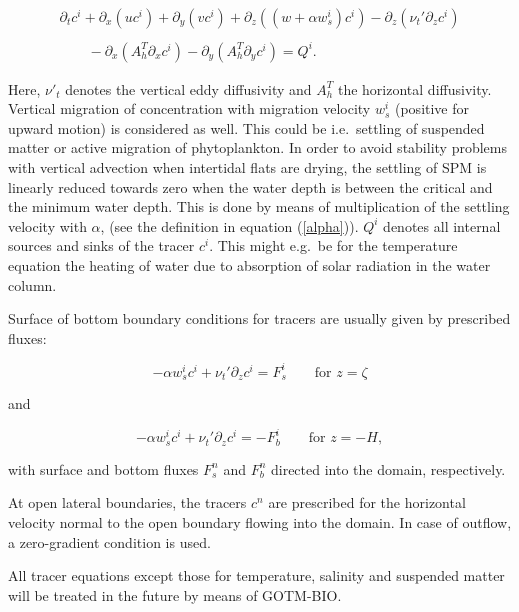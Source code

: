 \begin{equation}\label{densz}
\begin{array}{l}
\partial_t c^i +\partial_x (uc^i) +\partial_y(vc^i) 
+\partial_z ((w+\alpha w_s^i)c^i)
-\partial_z(\nu_t' \partial_z c^i)
\\ \\ \displaystyle \qquad
-\partial_x(A_h^T \partial_x c^i)
-\partial_y(A_h^T \partial_y c^i)
=Q^i.
\end{array} 
\end{equation}

Here, $\nu'_t$ denotes the vertical eddy diffusivity and
$A_h^T$ the horizontal diffusivity.
Vertical migration of concentration with migration velocity
$w_s^i$ (positive for upward motion) is considered as well. This could be 
i.e.\ settling of suspended matter or active migration of
phytoplankton.  
In order to avoid stability problems with vertical advection when 
intertidal flats are drying, the settling of SPM is linearly 
reduced towards zero when the water
depth is between the critical and the minimum water depth. 
This is
done by means of multiplication of the settling velocity with $\alpha$,
(see the definition in equation (\ref{alpha})).
$Q^i$ denotes all internal sources and sinks of the tracer $c^i$.
This might e.g.\ be for the temperature equation the heating of water
due to absorption of solar radiation in the water column.

Surface of bottom boundary conditions for tracers are usually given
by prescribed fluxes:

\begin{equation}\label{SurfFlux}
-\alpha w_s^i c^i+\nu_t' \partial_z c^i = F^i_s  \qquad \mbox{for } z=\zeta
\end{equation}

and 

\begin{equation}\label{BottFlux}
-\alpha w_s^i c^i+\nu_t' \partial_z c^i = -F^i_b  \qquad \mbox{for } z=-H,
\end{equation}

with surface and bottom fluxes $F^n_s$ and $F^n_b$ directed
into the domain, respectively. 

At open lateral boundaries, the tracers $c^n$ are prescribed for
the horizontal velocity normal to the open boundary 
flowing into the domain. In case of outflow, a zero-gradient condition is
used. 

All tracer equations except those for temperature, salinity and 
suspended matter will be treated in the future by means of GOTM-BIO.

